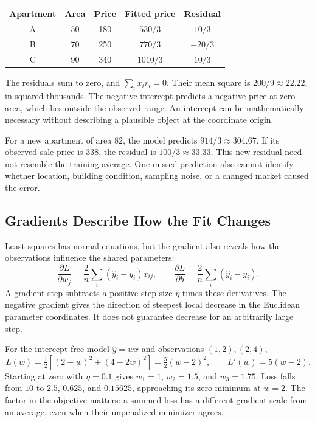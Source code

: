 \par\addvspace{\intextsep}\noindent\begin{minipage}{\linewidth}
\centering\small
\begin{tabular}{@{}ccccc@{}}
\toprule
Apartment & Area & Price & Fitted price & Residual \\
\midrule
A & 50 & 180 & $530/3$ & $10/3$ \\
B & 70 & 250 & $770/3$ & $-20/3$ \\
C & 90 & 340 & $1010/3$ & $10/3$ \\
\bottomrule
\end{tabular}
\label{tab:apartment-example}
\end{minipage}\par\addvspace{\intextsep}

The residuals sum to zero, and $\sum_i x_i r_i=0$. Their mean square is $200/9\approx22.22$, in squared thousands. The negative intercept predicts a negative price at zero area, which lies outside the observed range. An intercept can be mathematically necessary without describing a plausible object at the coordinate origin.

For a new apartment of area $82$, the model predicts $914/3\approx304.67$. If its observed sale price is $338$, the residual is $100/3\approx33.33$. This new residual need not resemble the training average. One missed prediction also cannot identify whether location, building condition, sampling noise, or a changed market caused the error.

\subsection{Gradients Describe How the Fit Changes}

Least squares has normal equations, but the gradient also reveals how the observations influence the shared parameters:
\[
\frac{\partial L}{\partial w_j}
=\frac2n\sum_i(\hat y_i-y_i)x_{ij},
\qquad
\frac{\partial L}{\partial b}
=\frac2n\sum_i(\hat y_i-y_i).
\]
A gradient step subtracts a positive step size $\eta$ times these derivatives. The negative gradient gives the direction of steepest local decrease in the Euclidean parameter coordinates. It does not guarantee decrease for an arbitrarily large step.

For the intercept-free model $\hat y=wx$ and observations $(1,2),(2,4)$,
\[
L(w)=\tfrac12[(2-w)^2+(4-2w)^2]=\tfrac52(w-2)^2,
\qquad L'(w)=5(w-2).
\]
Starting at zero with $\eta=0.1$ gives $w_1=1$, $w_2=1.5$, and $w_3=1.75$. Loss falls from $10$ to $2.5$, $0.625$, and $0.15625$, approaching its zero minimum at $w=2$. The factor in the objective matters: a summed loss has a different gradient scale from an average, even when their unpenalized minimizer agrees.


